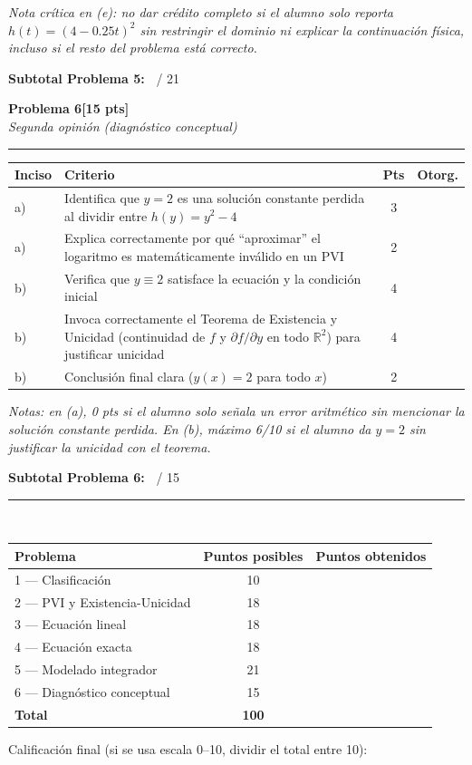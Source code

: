 \documentclass[11pt,letterpaper]{article}
\makeatletter
\newcommand{\problema}[3]{%
  \bigskip\bigskip\noindent
  {\Large\textbf{Problema #1}}\hfill\textbf{[#2 pts]}\\[3pt]
  {\small\itshape #3}\par
  \vspace{2pt}\hrule\vspace{8pt}
}
\newenvironment{tablarubrica}{%
  \begin{tabular}{@{}p{1.1cm}Lcc@{}}
  \toprule
  \textbf{Inciso} & \textbf{Criterio} & \textbf{Pts} & \textbf{Otorg.} \\
  \midrule
}{%
  \bottomrule
  \end{tabular}
}
\makeatother
\begin{document}
\textit{Nota crítica en (e): no dar crédito completo si el alumno solo reporta $h(t)=(4-0.25t)^2$ sin restringir el dominio ni explicar la continuación física, incluso si el resto del problema está correcto.}

\medskip
\noindent\textbf{Subtotal Problema 5:\ } \underline{\hspace{2.5cm}} / 21

\newpage
\problema{6}{15}{Segunda opinión (diagnóstico conceptual)}

\begin{tablarubrica}
a) & Identifica que $y=2$ es una solución constante perdida al dividir entre $h(y)=y^2-4$ & 3 & \\
a) & Explica correctamente por qué ``aproximar'' el logaritmo es matemáticamente inválido en un PVI & 2 & \\
b) & Verifica que $y\equiv2$ satisface la ecuación y la condición inicial & 4 & \\
b) & Invoca correctamente el Teorema de Existencia y Unicidad (continuidad de $f$ y $\partial f/\partial y$ en todo $\mathbb{R}^2$) para justificar unicidad & 4 & \\
b) & Conclusión final clara ($y(x)=2$ para todo $x$) & 2 & \\
\end{tablarubrica}

\textit{Notas: en (a), 0 pts si el alumno solo señala un error aritmético sin mencionar la solución constante perdida. En (b), máximo 6/10 si el alumno da $y=2$ sin justificar la unicidad con el teorema.}

\medskip
\noindent\textbf{Subtotal Problema 6:\ } \underline{\hspace{2.5cm}} / 15

\vspace{14pt}\hrule\vspace{10pt}

\\[4pt]
\begin{tabular}{lcc}
\toprule
Problema & Puntos posibles & Puntos obtenidos \\
\midrule
1 --- Clasificación & 10 & \\
2 --- PVI y Existencia-Unicidad & 18 & \\
3 --- Ecuación lineal & 18 & \\
4 --- Ecuación exacta & 18 & \\
5 --- Modelado integrador & 21 & \\
6 --- Diagnóstico conceptual & 15 & \\
\midrule
\textbf{Total} & \textbf{100} & \\
\bottomrule
\end{tabular}

\vspace{10pt}
\noindent Calificación final (si se usa escala 0--10, dividir el total entre 10): \underline{\hspace{3cm}}
\end{document}
